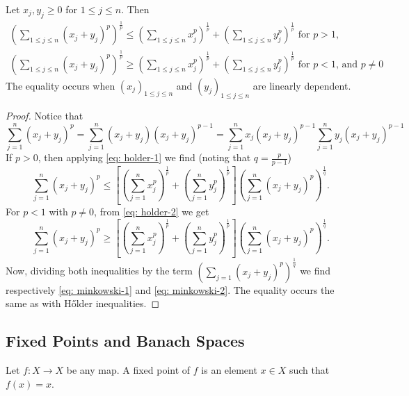 \begin{proposition}\label{prop: minkowski-ineq}
  Let \(x_j, y_j \geq 0\) for \(1 \leq j \leq n\). Then
  \begin{gather}
    \label{eq: minkowski-1}
    \left(\sum_{1 \leq j \leq n} (x_j + y_j)^p \right)^{\frac 1 p}
    \leq \left(\sum_{1 \leq j \leq n} x_j^p \right)^{\frac 1 p}
    + \left(\sum_{1 \leq j \leq n} y_j^p\right)^{\frac 1 p}
    \text{ for } p > 1,
    \\ \label{eq: minkowski-2}
    \left(\sum_{1 \leq j \leq n} (x_j + y_j)^p \right)^{\frac 1 p}
    \geq \left(\sum_{1 \leq j \leq n} x_j^p \right)^{\frac 1 p}
    + \left(\sum_{1 \leq j \leq n} y_j^p\right)^{\frac 1 p}
    \text{ for } p < 1 \text{, and } p \neq 0
  \end{gather}
  The equality occurs when \((x_j)_{1 \leq j \leq n}\) and \((y_j)_{1 \leq j
  \leq n}\) are linearly dependent.
\end{proposition}

\begin{proof}
  Notice that
  \[
    \sum_{j=1}^n (x_j + y_j)^p = \sum_{j=1}^n (x_j + y_j)(x_j + y_j)^{p-1}
    = \sum_{j=1}^n x_j (x_j + y_j)^{p-1} \sum_{j=1}^n y_j (x_j + y_j)^{p-1}
  \]
  If \(p > 0\), then applying \cref{eq: holder-1} we find (noting that \(q =
  \frac p {p - 1}\))
  \[
    \sum_{j=1}^n (x_j + y_j)^p \leq \left[
      \left(\sum_{j=1}^n x_j^p\right)^{\frac 1 p}
      + \left(\sum_{j=1}^n y_j^p\right)^{\frac 1 p}
    \right] \left(\sum_{j=1}^n (x_j + y_j)^p\right)^{\frac 1 q}.
  \]
  For \(p < 1\) with \(p \neq 0\), from \cref{eq: holder-2} we get
  \[
    \sum_{j=1}^n (x_j + y_j)^p \geq \left[
      \left(\sum_{j=1}^n x_j^p\right)^{\frac 1 p}
      + \left(\sum_{j=1}^n y_j^p\right)^{\frac 1 p}
    \right] \left(\sum_{j=1}^n (x_j + y_j)^p\right)^{\frac 1 q}.
  \]
  Now, dividing both inequalities by the term \(\left(\sum_{j=1} (x_j + y_j)^p
  \right)^{\frac 1 q}\) we find respectively \cref{eq: minkowski-1} and
  \cref{eq: minkowski-2}. The equality occurs the same as with H\H{o}lder
  inequalities.
\end{proof}

\subsection{Fixed Points and Banach Spaces}

\begin{definition}\label{def:fixed-point}
  Let \(f: X \to X\) be any map. A fixed point of \(f\) is an element \(x \in X\)
  such that \(f(x) = x\).
\end{definition}

